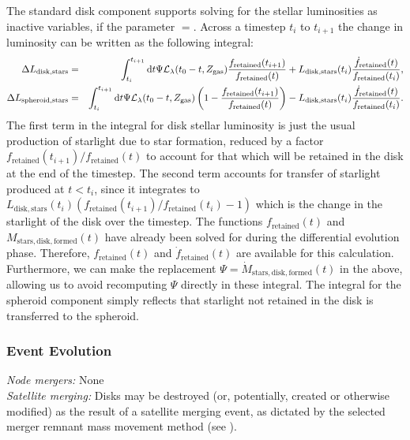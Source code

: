 The standard disk component supports solving for the stellar luminosities as inactive variables, if the parameter \mono{[diskLuminositiesStellarInactive]}$=$. Across a timestep $t_i$ to $t_{i+1}$ the change in luminosity can be written as the following integral:
\begin{eqnarray}
\Delta L_\mathrm{disk, stars} &=& \int_{t_{i}}^{t_{i+1}} \mathrm{d}t \Psi \mathcal{L}_\lambda(t_0-t,Z_\mathrm{gas}) {f_\mathrm{retained}(t_{i+1}) \over f_\mathrm{retained}(t)}  + L_\mathrm{disk, stars}(t_i) {\dot{f}_\mathrm{retained}(t) \over f_\mathrm{retained}(t_{i})}, \\
\Delta L_\mathrm{spheroid, stars} &=& \int_{t_{i}}^{t_{i+1}} \mathrm{d}t  \Psi \mathcal{L}_\lambda(t_0-t,Z_\mathrm{gas}) \left( 1 - {f_\mathrm{retained}(t_{i+1}) \over f_\mathrm{retained}(t)} \right) - L_\mathrm{disk, stars}(t_i) {\dot{f}_\mathrm{retained}(t) \over f_\mathrm{retained}(t_{i})}. \\
\end{eqnarray}
The first term in the integral for disk stellar luminosity is just the usual production of starlight due to star formation, reduced by a factor $f_\mathrm{retained}(t_{i+1}) / f_\mathrm{retained}(t)$ to account for that which will be retained in the disk at the end of the timestep. The second term accounts for transfer of starlight produced at $t<t_i$, since it integrates to $L_\mathrm{disk, stars}(t_i) (f_\mathrm{retained}(t_{i+1}) / f_\mathrm{retained}(t_{i}) - 1)$ which is the change in the starlight of the disk over the timestep. The functions $f_\mathrm{retained}(t)$ and $M_\mathrm{stars, disk, formed}(t)$ have already been solved for during the differential evolution phase. Therefore, $f_\mathrm{retained}(t)$ and $\dot{f}_\mathrm{retained}(t)$ are available for this calculation. Furthermore, we can make the replacement $\Psi = \dot{M}_\mathrm{stars, disk, formed}(t)$ in the above, allowing us to avoid recomputing $\Psi$ directly in these integral. The integral for the spheroid component simply reflects that starlight not retained in the disk is transferred to the spheroid.

\subsubsection{Event Evolution}

\noindent\emph{Node mergers:} None\\

\noindent\emph{Satellite merging:} Disks may be destroyed (or, potentially, created or otherwise modified) as the result of a satellite merging event, as dictated by the selected merger remnant mass movement method (see ).\\

